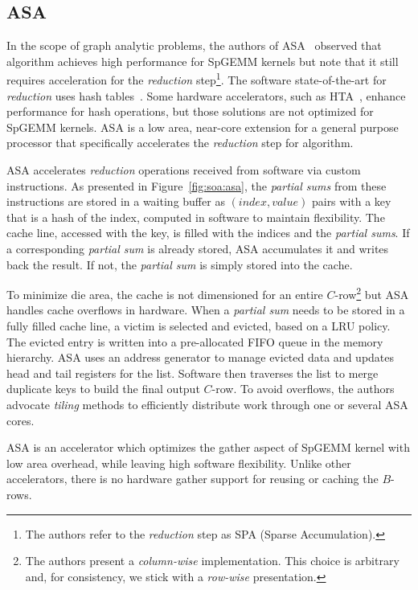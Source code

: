 
\subsection{ASA}
\label{sec:soa:asa}

In the scope of graph analytic problems, the authors of ASA~\cite{Zhang2022_ASA} observed that  algorithm achieves high performance for SpGEMM kernels but note that it still requires acceleration for the \emph{reduction} step\footnote{The authors refer to the \emph{reduction} step as SPA (Sparse Accumulation).}. The software state-of-the-art for \emph{reduction} uses hash tables~\cite{Brock2021_GraphBLAS}. Some hardware accelerators, such as HTA~\cite{Zhang2019_HTA}, enhance performance for hash operations, but those solutions are not optimized for SpGEMM kernels. ASA is a low area, near-core extension for a general purpose processor that specifically accelerates the \emph{reduction} step for  algorithm.

ASA accelerates \emph{reduction} operations received from software via custom instructions.
As presented in Figure~\ref{fig:soa:asa}, the \emph{partial sums} from these instructions are stored in a waiting buffer as $(index, value)$ pairs with a key that is a hash of the index, computed in software to maintain flexibility. The cache line, accessed with the key, is filled with the indices and the \emph{partial sums}. If a corresponding \emph{partial sum} is already stored, ASA accumulates it and writes back the result. If not, the \emph{partial sum} is simply stored into the cache. 

To minimize die area, the cache is not dimensioned for an entire $C$-row\footnote{The authors present a \emph{column-wise}  implementation. This choice is arbitrary and, for consistency, we stick with a \emph{row-wise} presentation.} but ASA handles cache overflows in hardware. When a \emph{partial sum} needs to be stored in a fully filled cache line, a victim is selected and evicted, based on a LRU policy. The evicted entry is written into a pre-allocated FIFO queue in the memory hierarchy. ASA uses an address generator to manage evicted data and updates head and tail registers for the list. Software then traverses the list to merge duplicate keys to build the final output $C$-row. To avoid overflows, the authors advocate \emph{tiling} methods to efficiently distribute work through one or several ASA cores.


ASA is an accelerator which  optimizes the \gls{gather} aspect of SpGEMM kernel with low area overhead, while leaving high software flexibility. Unlike other  accelerators, there is no hardware \gls{gather} support for reusing or caching the $B$-rows.